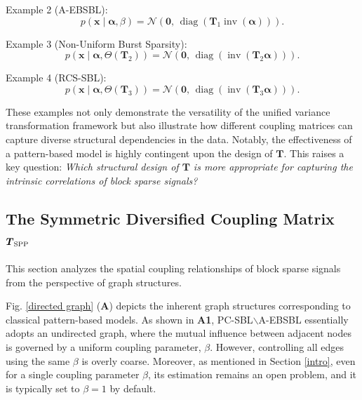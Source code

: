 \documentclass[lettersize,journal]{IEEEtran}
\DeclareMathOperator{\inv}{inv}
\DeclareMathOperator{\diag}{diag}
\theoremstyle{remark}
\begin{document}
\noindent  Example 2 (A-EBSBL):
\begin{equation}
	p(\mathbf{x} \mid \boldsymbol{\alpha}, \beta) = \mathcal{N}\left(\mathbf{0},\,\diag\left(\boldsymbol{T}_1\inv\left(\boldsymbol{\alpha}\right)\right)\right).
\end{equation}

\noindent Example 3 (Non-Uniform Burst Sparsity):
\begin{equation}
	p(\mathbf{x} \mid \boldsymbol{\alpha}, \Theta(\boldsymbol{T}_2)) = \mathcal{N}\left(\mathbf{0},\,\diag\left(\inv\left(\boldsymbol{T}_2\boldsymbol{\alpha}\right)\right)\right).
\end{equation}

\noindent Example 4 (RCS-SBL):
\begin{equation}
	p(\mathbf{x} \mid \boldsymbol{\alpha}, \Theta(\boldsymbol{T}_3)) = \mathcal{N}\left(\mathbf{0},\,\diag\left(\inv\left(\boldsymbol{T}_3\boldsymbol{\alpha}\right)\right)\right).
\end{equation}




These examples not only demonstrate the versatility of the unified variance transformation framework but also illustrate how different coupling matrices can capture diverse structural dependencies in the data.
Notably, the effectiveness of a pattern-based model is highly contingent upon the design of \( \boldsymbol{T} \). This raises a key question: \emph{Which structural design of \( \boldsymbol{T} \) is more appropriate for capturing the intrinsic correlations of block sparse signals?}




\subsection{The Symmetric Diversified Coupling Matrix $\boldsymbol{T}_{\rm SPP}$}


This section analyzes the spatial coupling relationships of block sparse signals from the perspective of graph structures. 

Fig. \ref{directed graph} (\textbf{A}) depicts the inherent graph structures corresponding to classical pattern-based models. As shown in \textbf{A1}, PC-SBL$\backslash$A-EBSBL essentially adopts an undirected graph, where the mutual influence between adjacent nodes is governed by a uniform coupling parameter, $\beta$. However, controlling all edges using the same $\beta$ is overly coarse. Moreover, as mentioned in Section \ref{intro}, even for a single coupling parameter $\beta$, its estimation remains an open problem, and it is typically set to $\beta=1$ by default.  
\end{document}
